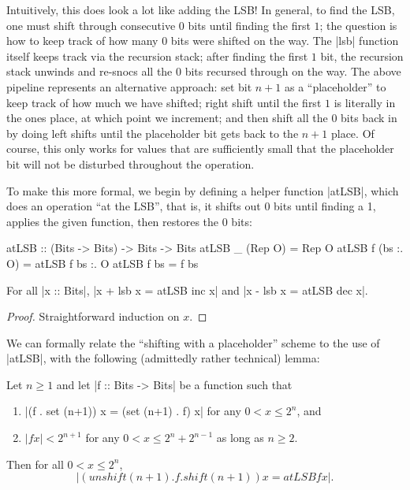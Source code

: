 \begin{figure}
\begin{center}
\begin{diagram}[width=300]
\end{diagram}
\end{center}
\end{figure}

Intuitively, this does look a lot like adding the LSB!  In general, to
find the LSB, one must shift through consecutive $0$ bits until
finding the first $1$; the question is how to keep track of how many
$0$ bits were shifted on the way.  The |lsb| function itself keeps
track via the recursion stack; after finding the first $1$ bit, the
recursion stack unwinds and re-snocs all the $0$ bits recursed through
on the way.  The above pipeline represents an alternative approach:
set bit $n+1$ as a ``placeholder'' to keep track of how much we have
shifted; right shift until the first $1$ is literally in the ones
place, at which point we increment; and then shift all the $0$ bits
back in by doing left shifts until the placeholder bit gets back to
the $n+1$ place. Of course, this only works for values that are
sufficiently small that the placeholder bit will not be disturbed
throughout the operation.

To make this more formal, we begin by defining a helper function
|atLSB|, which does an operation ``at the LSB'', that is, it shifts
out 0 bits until finding a 1, applies the given function, then
restores the 0 bits:

\begin{code}

atLSB :: (Bits -> Bits) -> Bits -> Bits
atLSB _ (Rep O) = Rep O
atLSB f (bs :. O) = atLSB f bs :. O
atLSB f bs = f bs

\end{code}

\begin{lem} \label{lem:addlsb}
  For all |x :: Bits|, |x + lsb x = atLSB inc x| and |x - lsb x =
  atLSB dec x|.
\end{lem}

\begin{proof}
  Straightforward induction on $x$.
\end{proof}

We can formally relate the ``shifting with a placeholder'' scheme to
the use of |atLSB|, with the following (admittedly rather technical)
lemma:

\begin{lem} \label{lem:placeholder-scheme} Let $n \geq 1$ and let |f
  :: Bits -> Bits| be a function such that
  \begin{enumerate}
  \item |(f . set (n+1)) x = (set (n+1) . f) x| for any $0 < x \leq
    2^n$, and
  \item $|f x| < 2^{n+1}$ for any $0 < x \leq 2^n + 2^{n-1}$ as long
    as $n \geq 2$.
  \end{enumerate}
  Then for all $0 < x \leq 2^n$,
  \[ |(unshift (n+1) . f . shift (n+1)) x = atLSB f x|. \]
\end{lem}

